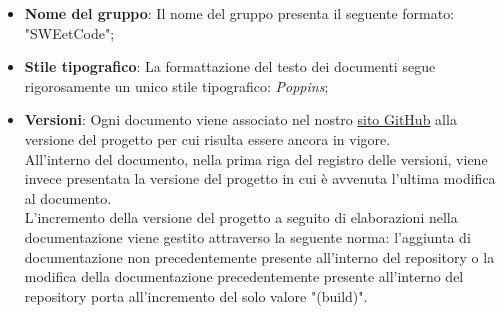 \documentclass[10pt, a4paper]{article}
\begin{document}
\begin{itemize}
        \item{\textbf{Nome del gruppo}}: Il nome del gruppo presenta il seguente formato: "SWEetCode";

        \item{\textbf{Stile tipografico}}: La formattazione del testo dei documenti segue rigorosamente un unico stile tipografico: 
        \textit{Poppins};
        
        \item {\textbf{Versioni}}: Ogni documento viene associato nel nostro \href{https://sweetcode-team.github.io/}{sito GitHub} alla 
        versione del progetto per cui risulta essere ancora in vigore.\\
        All'interno del documento, nella prima riga del registro delle versioni, viene invece presentata la versione del progetto in cui è 
        avvenuta l'ultima modifica al documento.\\
        L'incremento della versione del progetto a seguito di elaborazioni nella documentazione viene gestito attraverso la seguente norma: 
        l'aggiunta di documentazione non precedentemente presente all'interno del repository o la modifica della documentazione 
        precedentemente presente all'interno del repository porta all'incremento del solo valore "(build)".
        \end{itemize}
\end{document}
